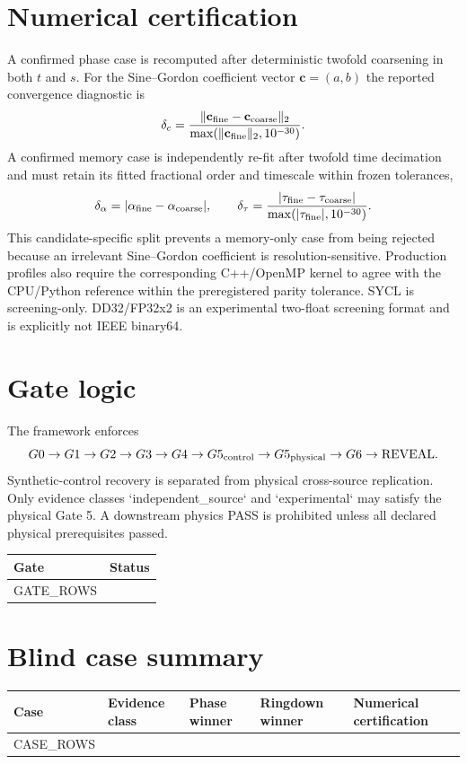 \documentclass[11pt]{article}
\begin{document}
\section{Numerical certification}
A confirmed phase case is recomputed after deterministic twofold coarsening in both $t$ and $s$.  For the Sine--Gordon coefficient vector $\mathbf c=(a,b)$ the reported convergence diagnostic is
\begin{equation}
\delta_c=\frac{\|\mathbf c_{\rm fine}-\mathbf c_{\rm coarse}\|_2}{\max(\|\mathbf c_{\rm fine}\|_2,10^{-30})}.
\end{equation}
A confirmed memory case is independently re-fit after twofold time decimation and must retain its fitted fractional order and timescale within frozen tolerances,
\begin{equation}
\delta_\alpha=|\alpha_{\rm fine}-\alpha_{\rm coarse}|,
\qquad
\delta_\tau=\frac{|\tau_{\rm fine}-\tau_{\rm coarse}|}{\max(|\tau_{\rm fine}|,10^{-30})}.
\end{equation}
This candidate-specific split prevents a memory-only case from being rejected because an irrelevant Sine--Gordon coefficient is resolution-sensitive.  Production profiles also require the corresponding C++/OpenMP kernel to agree with the CPU/Python reference within the preregistered parity tolerance.  SYCL is screening-only. DD32/FP32x2 is an experimental two-float screening format and is explicitly not IEEE binary64.

\section{Gate logic}
The framework enforces
\[
G0\rightarrow G1\rightarrow G2\rightarrow G3\rightarrow G4\rightarrow G5_{\rm control}\rightarrow G5_{\rm physical}\rightarrow G6\rightarrow\mathrm{REVEAL}.
\]
Synthetic-control recovery is separated from physical cross-source replication. Only evidence classes `independent\_source` and `experimental` may satisfy the physical Gate 5. A downstream physics PASS is prohibited unless all declared physical prerequisites passed.

\begin{longtable}{ll}
\toprule Gate & Status\\\midrule
{{GATE_ROWS}}
\bottomrule
\end{longtable}

\section{Blind case summary}
\begin{longtable}{lllll}
\toprule Case & Evidence class & Phase winner & Ringdown winner & Numerical certification\\\midrule
{{CASE_ROWS}}
\bottomrule
\end{longtable}
\end{document}
